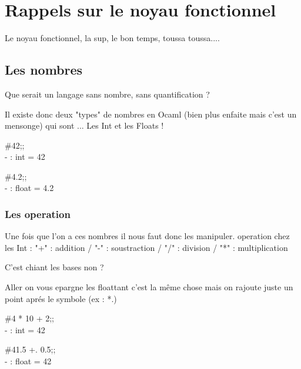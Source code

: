 \section{Rappels sur le noyau fonctionnel}

\begin{frame}
  \begin{center}
  Le noyau fonctionnel, la sup, le bon temps, toussa toussa....
  \end{center}
\end{frame}

\subsection{Les nombres}
\begin{frame}
  \begin{center}
  Que serait un langage sans nombre, sans quantification ? 
  \end{center}
  Il existe donc deux "types" de nombres en Ocaml (bien plus enfaite mais c'est un mensonge) qui sont ... Les Int et les Floats !\\
  \vspace{0.5cm} 
  \begin{minipage}[t]{5cm}
  \#42;;\\
  - : int  = 42
\end{minipage}
\begin{minipage}[t]{5cm}
\#4.2;;\\
- : float = 4.2
\end{minipage}

\end{frame}


  \subsubsection{Les operation}
  \begin{frame}
    Une fois que l'on a ces nombres il nous faut donc les manipuler. 
    operation chez les Int : "+" : addition / "-" : soustraction / "/" : division / "*" : multiplication\\
    \begin{center}
    C'est chiant les bases non ?\\ 
  \end{center}
    Aller on vous epargne les floattant c'est la même chose mais on rajoute juste un point aprés le symbole (ex : *.)\\
    \vspace{0.5cm}
    \begin{minipage}[t]{5cm}
      \#4 * 10 + 2;;\\
      - : int = 42
     \end{minipage}
     \begin{minipage}[t]{5cm}
       \#41.5 +. 0.5;;\\
       - : float = 42
     \end{minipage}
   \end{frame}
